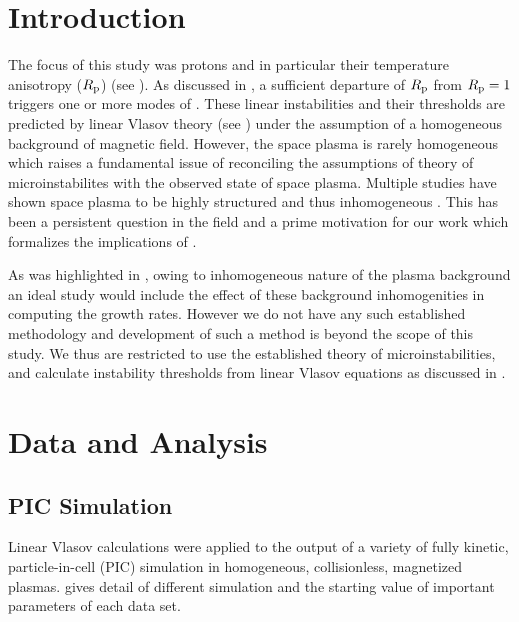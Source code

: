     \section{Introduction}\label{sec:intr5}

        The focus of this study was protons and in particular their temperature anisotropy ($R_{\rm
        p}$) (see ). As discussed in , a sufficient departure of
        $R_{\rm p}$ from $R_{\rm p}=1$ triggers one or more modes of . These linear
        instabilities and their thresholds are predicted by linear Vlasov theory (see
        ) under the assumption of a homogeneous background of magnetic field.
        However, the space plasma is rarely homogeneous which raises a fundamental issue of
        reconciling the assumptions of theory of microinstabilites with the observed state of space
        plasma. Multiple studies have shown space plasma to be highly structured and thus
        inhomogeneous \citep{Burlaga1968, Tsurutani1979, Ness2001, Osman2012, Osman2012a,
        Greco2012}. This has been a persistent question in the field and a prime motivation for our
        work which formalizes the implications of \citet{Osman2012}.

        As was highlighted in , owing to inhomogeneous nature of the plasma
        background an ideal study would include the effect of these background inhomogenities in
        computing the growth rates. However we do not have any such established methodology and
        development of such a method is beyond the scope of this study. We thus are restricted to
        use the established theory of microinstabilities, and calculate instability thresholds from
        linear Vlasov equations as discussed in .

    \section{Data and Analysis} \label{sec:danl5}

        \subsection{PIC Simulation}\label{sec:pic5}

            Linear Vlasov calculations were applied to the output of a variety of fully kinetic,
            particle-in-cell (PIC) simulation in homogeneous, collisionless, magnetized plasmas.
             gives detail of different simulation and the starting value of
            important parameters of each data set.

